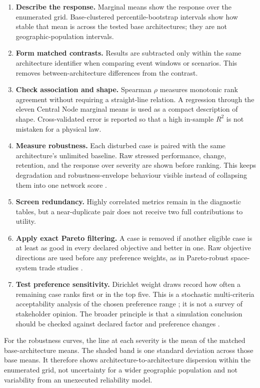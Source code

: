 \begin{enumerate}
\item \textbf{Describe the response.} Marginal means show the response over the enumerated grid. Base-clustered percentile-bootstrap intervals \citep{Efron1979} show how stable that mean is across the tested base architectures; they are not geographic-population intervals.
\item \textbf{Form matched contrasts.} Results are subtracted only within the same architecture identifier when comparing event windows or scenarios. This removes between-architecture differences from the contrast.
\item \textbf{Check association and shape.} Spearman $\rho$ measures monotonic rank agreement without requiring a straight-line relation. A regression through the eleven Central Node marginal means is used as a compact description of shape. Cross-validated error is reported so that a high in-sample $R^2$ is not mistaken for a physical law.
\item \textbf{Measure robustness.} Each disturbed case is paired with the same architecture's unlimited baseline. Raw stressed performance, change, retention, and the response over severity are shown before ranking. This keeps degradation and robustness-envelope behaviour visible instead of collapsing them into one network score \citep{Trajanovski2013,Xu2023}.
\item \textbf{Screen redundancy.} Highly correlated metrics remain in the diagnostic tables, but a near-duplicate pair does not receive two full contributions to utility.
\item \textbf{Apply exact Pareto filtering.} A case is removed if another eligible case is at least as good in every declared objective and better in one. Raw objective directions are used before any preference weights, as in Pareto-robust space-system trade studies \citep{Ridolfi2013}.
\item \textbf{Test preference sensitivity.} Dirichlet weight draws record how often a remaining case ranks first or in the top five. This is a stochastic multi-criteria acceptability analysis of the chosen preference range \citep{LahdelmaSalminen2001}; it is not a survey of stakeholder opinion. The broader principle is that a simulation conclusion should be checked against declared factor and preference changes \citep{Kleijnen2005}.
\end{enumerate}

For the robustness curves, the line at each severity is the mean of the matched base-architecture means. The shaded band is one standard deviation across those base means. It therefore shows architecture-to-architecture dispersion within the enumerated grid, not uncertainty for a wider geographic population and not variability from an unexecuted reliability model.

